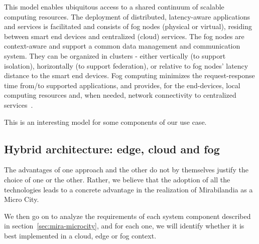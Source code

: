 This model enables ubiquitous access to a shared continuum of scalable computing resources.
The deployment of distributed, latency-aware applications and services is facilitated and consists of fog nodes (physical or virtual), residing between smart end devices and centralized (cloud) services.
The fog nodes are context-aware and support a common data management and communication system.
They can be organized in clusters - either vertically (to support isolation), horizontally (to support federation), or relative to fog nodes' latency distance to the smart end devices. Fog computing minimizes the request-response time from/to supported applications, and provides, for the end-devices, local computing resources and, when needed, network connectivity to centralized services~\cite{iorga2018fog}.

This is an interesting model for some components of our use case.

\subsection{Hybrid architecture: edge, cloud and fog}
The advantages of one approach and the other do not by themselves justify the choice of one or the other. Rather, we believe that the adoption of all the technologies leads to a concrete advantage in the realization of Mirabilandia as a Micro City.

We then go on to analyze the requirements of each system component described in section~\ref{sec:mira-microcity}, and for each one, we will identify whether it is best implemented in a cloud, edge or fog context.

